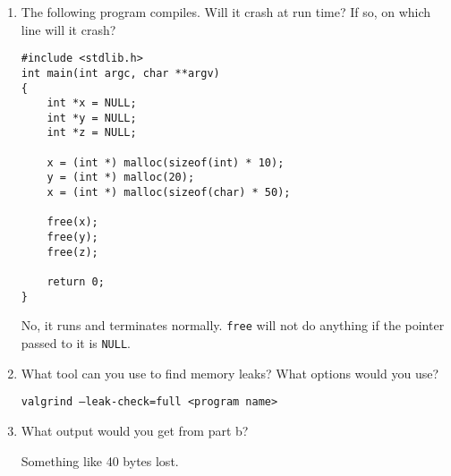 \begin{enumerate}
\item The following program compiles. Will it crash at run time? If so, on which line will it crash?

\begin{lstlisting}
#include <stdlib.h>
int main(int argc, char **argv)
{
	int *x = NULL;
	int *y = NULL;
	int *z = NULL;

	x = (int *) malloc(sizeof(int) * 10);
	y = (int *) malloc(20);
	x = (int *) malloc(sizeof(char) * 50);

	free(x);
	free(y);
	free(z);

	return 0;
}
\end{lstlisting}

\begin{answer}
No, it runs and terminates normally.
\texttt{free} will not do anything if the pointer passed to it is \texttt{NULL}.
\end{answer}

\item What tool can you use to find memory leaks? What options would you use?

\begin{answer}
\texttt{valgrind --leak-check=full <program name>}
\end{answer}

\item What output would you get from part b?

\begin{answer}
Something like 40 bytes lost.
\end{answer}
\end{enumerate}
